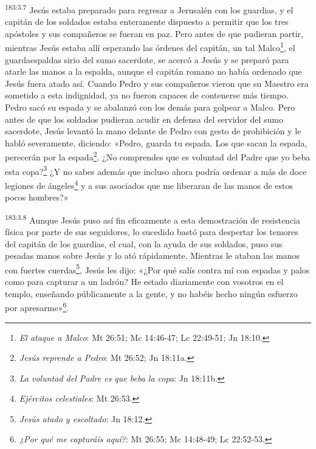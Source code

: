 \par 
\textsuperscript{183:3.7} Jesús estaba preparado para regresar a Jerusalén con los guardias, y el capitán de los soldados estaba enteramente dispuesto a permitir que los tres apóstoles y sus compañeros se fueran en paz. Pero antes de que pudieran partir, mientras Jesús estaba allí esperando las órdenes del capitán, un tal Malco\footnote{\textit{El ataque a Malco}: Mt 26:51; Mc 14:46-47; Lc 22:49-51; Jn 18:10.}, el guardaespaldas sirio del sumo sacerdote, se acercó a Jesús y se preparó para atarle las manos a la espalda, aunque el capitán romano no había ordenado que Jesús fuera atado así. Cuando Pedro y sus compañeros vieron que su Maestro era sometido a esta indignidad, ya no fueron capaces de contenerse más tiempo. Pedro sacó su espada y se abalanzó con los demás para golpear a Malco. Pero antes de que los soldados pudieran acudir en defensa del servidor del sumo sacerdote, Jesús levantó la mano delante de Pedro con gesto de prohibición y le habló severamente, diciendo: «Pedro, guarda tu espada. Los que sacan la espada, perecerán por la espada\footnote{\textit{Jesús reprende a Pedro}: Mt 26:52; Jn 18:11a.}. ¿No comprendes que es voluntad del Padre que yo beba esta copa?\footnote{\textit{La voluntad del Padre es que beba la copa}: Jn 18:11b.} ¿Y no sabes además que incluso ahora podría ordenar a más de doce legiones de ángeles\footnote{\textit{Ejércitos celestiales}: Mt 26:53.} y a sus asociados que me liberaran de las manos de estos pocos hombres?»

\par 
\textsuperscript{183:3.8} Aunque Jesús puso así fin eficazmente a esta demostración de resistencia física por parte de sus seguidores, lo sucedido bastó para despertar los temores del capitán de los guardias, el cual, con la ayuda de sus soldados, puso sus pesadas manos sobre Jesús y lo ató rápidamente. Mientras le ataban las manos con fuertes cuerdas\footnote{\textit{Jesús atado y escoltado}: Jn 18:12.}, Jesús les dijo: «¿Por qué salís contra mí con espadas y palos como para capturar a un ladrón? He estado diariamente con vosotros en el templo, enseñando públicamente a la gente, y no habéis hecho ningún esfuerzo por apresarme»\footnote{\textit{¿Por qué me capturáis aquí?}: Mt 26:55; Mc 14:48-49; Lc 22:52-53.}.

